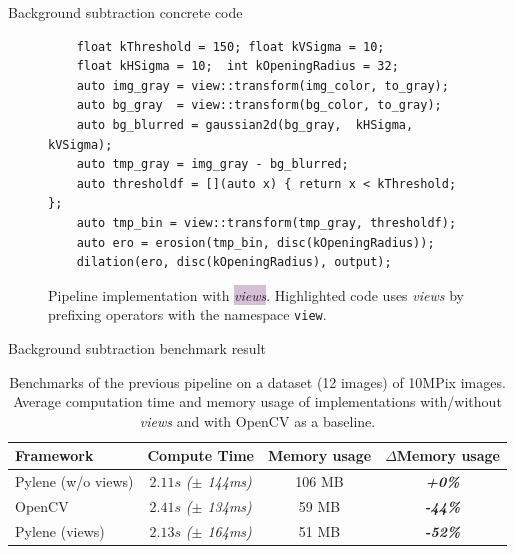 \documentclass[12pt,aspectratio=169]{beamer}
\begin{document}
\newcommand{\mystd}[1]{{\itshape(\(\pm\) #1)}}
\newcommand{\mydelta}[1]{{\itshape\bfseries #1\%}}

\begin{frame}[fragile]{Background subtraction concrete code}
  \begin{figure}
    \begin{verbatim}
    float kThreshold = 150; float kVSigma = 10;
    float kHSigma = 10;  int kOpeningRadius = 32;
    auto img_gray = view::transform(img_color, to_gray);
    auto bg_gray  = view::transform(bg_color, to_gray);
    auto bg_blurred = gaussian2d(bg_gray,  kHSigma, kVSigma);
    auto tmp_gray = img_gray - bg_blurred;
    auto thresholdf = [](auto x) { return x < kThreshold; };
    auto tmp_bin = view::transform(tmp_gray, thresholdf);
    auto ero = erosion(tmp_bin, disc(kOpeningRadius));
    dilation(ero, disc(kOpeningRadius), output);
    \end{verbatim}
    \caption{Pipeline implementation with \colorbox{thistle}{\emph{views}}. Highlighted code uses \emph{views} by
      prefixing operators with the namespace \texttt{view}.}
    \label{fig:view.comp.sub_bg.view_code}
  \end{figure}
\end{frame}

\begin{frame}[fragile]{Background subtraction benchmark result}
  \begin{table}
    \centering
    \begin{tabular}{l|ccc}
      \toprule
      Framework          & Compute Time            & Memory usage & \(\Delta{}\)Memory usage \\ \midrule
      Pylene (w/o views) & \(2.11s\) \mystd{144ms} & 106 MB       & \mydelta{+0}             \\
      OpenCV             & \(2.41s\) \mystd{134ms} & 59 MB        & \mydelta{-44}            \\
      Pylene (views)     & \(2.13s\) \mystd{164ms} & 51 MB        & \mydelta{-52}            \\
      \bottomrule
    \end{tabular}
    \caption{Benchmarks of the previous pipeline on a dataset (12 images) of 10MPix images. Average
      computation time and memory usage of implementations with/without \emph{views} and with OpenCV as a baseline.}
    \label{table:views.perf}
  \end{table}
\end{frame}
\end{document}
